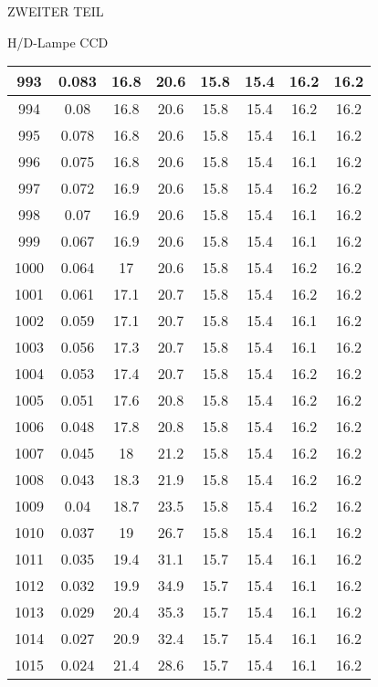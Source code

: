 \begin{appendix}
\begin{chapter}{ZWEITER TEIL}
\begin{section}{H/D-Lampe CCD}
\begin{scriptsize}
\begin{longtable}[htbp]{|c|c|c|c|c|c|c|c|}
            993 & 0.083 & 16.8 & 20.6 & 15.8 & 15.4 & 16.2 & 16.2 \\ \hline
            994 & 0.08 & 16.8 & 20.6 & 15.8 & 15.4 & 16.2 & 16.2 \\ \hline
            995 & 0.078 & 16.8 & 20.6 & 15.8 & 15.4 & 16.1 & 16.2 \\ \hline
            996 & 0.075 & 16.8 & 20.6 & 15.8 & 15.4 & 16.1 & 16.2 \\ \hline
            997 & 0.072 & 16.9 & 20.6 & 15.8 & 15.4 & 16.2 & 16.2 \\ \hline
            998 & 0.07 & 16.9 & 20.6 & 15.8 & 15.4 & 16.1 & 16.2 \\ \hline
            999 & 0.067 & 16.9 & 20.6 & 15.8 & 15.4 & 16.1 & 16.2 \\ \hline
            1000 & 0.064 & 17 & 20.6 & 15.8 & 15.4 & 16.2 & 16.2 \\ \hline
            1001 & 0.061 & 17.1 & 20.7 & 15.8 & 15.4 & 16.2 & 16.2 \\ \hline
            1002 & 0.059 & 17.1 & 20.7 & 15.8 & 15.4 & 16.1 & 16.2 \\ \hline
            1003 & 0.056 & 17.3 & 20.7 & 15.8 & 15.4 & 16.1 & 16.2 \\ \hline
            1004 & 0.053 & 17.4 & 20.7 & 15.8 & 15.4 & 16.2 & 16.2 \\ \hline
            1005 & 0.051 & 17.6 & 20.8 & 15.8 & 15.4 & 16.2 & 16.2 \\ \hline
            1006 & 0.048 & 17.8 & 20.8 & 15.8 & 15.4 & 16.2 & 16.2 \\ \hline
            1007 & 0.045 & 18 & 21.2 & 15.8 & 15.4 & 16.2 & 16.2 \\ \hline
            1008 & 0.043 & 18.3 & 21.9 & 15.8 & 15.4 & 16.2 & 16.2 \\ \hline
            1009 & 0.04 & 18.7 & 23.5 & 15.8 & 15.4 & 16.2 & 16.2 \\ \hline
            1010 & 0.037 & 19 & 26.7 & 15.8 & 15.4 & 16.1 & 16.2 \\ \hline
            1011 & 0.035 & 19.4 & 31.1 & 15.7 & 15.4 & 16.1 & 16.2 \\ \hline
            1012 & 0.032 & 19.9 & 34.9 & 15.7 & 15.4 & 16.1 & 16.2 \\ \hline
            1013 & 0.029 & 20.4 & 35.3 & 15.7 & 15.4 & 16.1 & 16.2 \\ \hline
            1014 & 0.027 & 20.9 & 32.4 & 15.7 & 15.4 & 16.1 & 16.2 \\ \hline
            1015 & 0.024 & 21.4 & 28.6 & 15.7 & 15.4 & 16.1 & 16.2 \\ \hline

\end{longtable}
\end{scriptsize}
\end{section}
\end{chapter}
\end{appendix}
